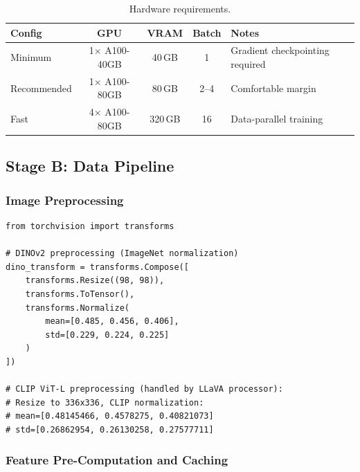 \documentclass[11pt,a4paper]{article}
\begin{document}
\begin{table}[h]
\centering
\caption{Hardware requirements.}
\label{tab:hardware}
\renewcommand{\arraystretch}{1.15}
\small
\begin{tabular}{@{}lcccl@{}}
  \toprule
  Config & GPU & VRAM & Batch & Notes \\
  \midrule
  Minimum & 1$\times$ A100-40GB & 40\,GB & 1
    & Gradient checkpointing required \\
  Recommended & 1$\times$ A100-80GB & 80\,GB & 2--4
    & Comfortable margin \\
  Fast & 4$\times$ A100-80GB & 320\,GB & 16
    & Data-parallel training \\
  \bottomrule
\end{tabular}
\end{table}

\subsection{Stage B: Data Pipeline}

\subsubsection{Image Preprocessing}

\begin{lstlisting}[caption={Separate preprocessing for DINOv2 and CLIP.}]
from torchvision import transforms

# DINOv2 preprocessing (ImageNet normalization)
dino_transform = transforms.Compose([
    transforms.Resize((98, 98)),
    transforms.ToTensor(),
    transforms.Normalize(
        mean=[0.485, 0.456, 0.406],
        std=[0.229, 0.224, 0.225]
    )
])

# CLIP ViT-L preprocessing (handled by LLaVA processor):
# Resize to 336x336, CLIP normalization:
# mean=[0.48145466, 0.4578275, 0.40821073]
# std=[0.26862954, 0.26130258, 0.27577711]
\end{lstlisting}

\subsubsection{Feature Pre-Computation and Caching}
\end{document}

